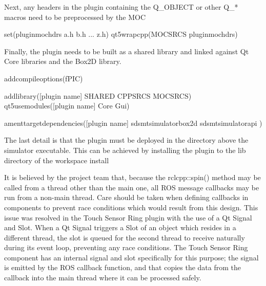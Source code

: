 \documentclass[letterpaper,10pt,english]{sphinxmanual}
\begin{document}
Next, any headers in the plugin containing the Q\_OBJECT or other Q\_* macros need to be preprocessed by the MOC

%
\begin{sphinxVerbatim}[commandchars=\\\{\}]
set(plugin\PYGZus{}moc\PYGZus{}hdrs a.h b.h ... z.h)
qt5\PYGZus{}wrap\PYGZus{}cpp(MOC\PYGZus{}SRCS \PYGZdl{}\PYGZob{}plugin\PYGZus{}moc\PYGZus{}hdrs\PYGZcb{})
\end{sphinxVerbatim}

Finally, the plugin needs to be built as a shared library and linked against Qt Core libraries and the Box2D library.

%
\begin{sphinxVerbatim}[commandchars=\\\{\}]
add\PYGZus{}compile\PYGZus{}options(\PYGZhy{}fPIC)

add\PYGZus{}library([plugin name] SHARED \PYGZdl{}\PYGZob{}CPP\PYGZus{}SRCS\PYGZcb{} \PYGZdl{}\PYGZob{}MOC\PYGZus{}SRCS\PYGZcb{})
qt5\PYGZus{}use\PYGZus{}modules([plugin name] Core Gui)

ament\PYGZus{}target\PYGZus{}dependencies([plugin name]
\PYGZdq{}sdsmt\PYGZus{}simulator\PYGZus{}box2d\PYGZdq{}
\PYGZdq{}sdsmt\PYGZus{}simulator\PYGZus{}api\PYGZdq{}
)
\end{sphinxVerbatim}

The last detail is that the plugin must be deployed in the directory above the simulator executable. This can be achieved by installing the plugin to
the lib directory of the workspace install

%
\begin{sphinxVerbatim}[commandchars=\\\{\}]
         \PYG{p}{[} \PYG{p}{]}
         
\end{sphinxVerbatim}


It is believed by the project team that, because the rclcpp::spin() method may be called from a thread other than the main one, all ROS message callbacks may be run
from a non-main thread. Care should be taken when defining callbacks in components to prevent race conditions which would result from this design. This issue was
resolved in the Touch Sensor Ring plugin with the use of a Qt Signal and Slot. When a Qt Signal triggers a Slot of an object which resides in a different thread,
the slot is queued for the second thread to receive naturally during its event loop, preventing any race conditions. The Touch Sensor Ring component has an internal
signal and slot specifically for this purpose; the signal is emitted by the ROS callback function, and that copies the data from the callback into the main thread
where it can be processed safely.
\end{document}
